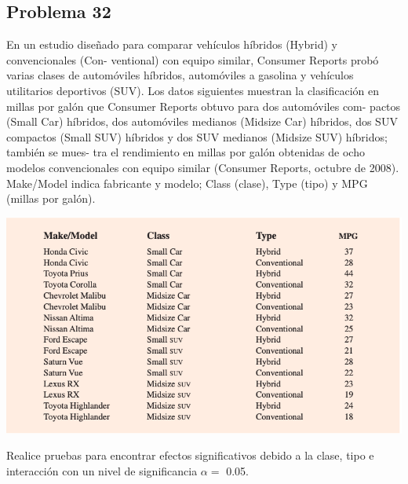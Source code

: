 \documentclass[a4paper,12pt]{article}
\begin{document}
\subsection{Problema 32}
En un estudio diseñado para comparar vehículos híbridos (Hybrid) y convencionales (Con- ventional) con equipo similar, Consumer Reports probó varias clases de automóviles híbridos, automóviles a gasolina y vehículos utilitarios deportivos (SUV). Los datos siguientes muestran la clasificación en millas por galón que Consumer Reports obtuvo para dos automóviles com- pactos (Small Car) híbridos, dos automóviles medianos (Midsize Car) híbridos, dos SUV compactos (Small SUV) híbridos y dos SUV medianos (Midsize SUV) híbridos; también se mues- tra el rendimiento en millas por galón obtenidas de ocho modelos convencionales con equipo similar (Consumer Reports, octubre de 2008). Make/Model indica fabricante y modelo; Class (clase), Type (tipo) y MPG (millas por galón).
\begin{center}
    \includegraphics[scale=0.5]{Images/32.png}
\end{center}
Realice pruebas para encontrar efectos significativos debido a la clase, tipo e interacción con un nivel de significancia $\alpha=$ 0.05.
\end{document}
